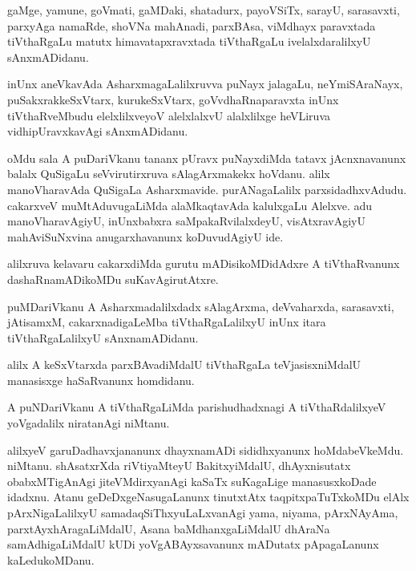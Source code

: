 \documentclass{article}
\begin{document}
\begin{mn}%
gaMge, yamune, goVmati, gaMDaki, shatadurx, payoVSiTx, sarayU, sarasavxti, parxyAga namaRde, shoVNa 
mahAnadi, parxBAsa, viMdhayx paravxtada tiVthaRgaLu matutx himavatapxravxtada tiVthaRgaLu 
ivelalxdaralilxyU sAnxmADidanu.
\end{mn}

\begin{mn}%
inUnx aneVkavAda AsharxmagaLalilxruvva puNayx jalagaLu, neYmiSAraNayx, puSakxrakkeSxVtarx, 
kurukeSxVtarx, goVvdhaRnaparavxta inUnx tiVthaRveMbudu elelxlilxveyoV alelxlalxvU alalxlilxge 
heVLiruva vidhipUravxkavAgi sAnxmADidanu.
\end{mn}

\begin{mn}%
oMdu sala A puDariVkanu tananx pUravx puNayxdiMda tatavx jAcnxnavanunx balalx QuSigaLu 
seVvirutirxruva sAlagArxmakekx hoVdanu. alilx manoVharavAda QuSigaLa Asharxmavide. purANagaLalilx 
parxsidadhxvAdudu. cakarxveV muMtAduvugaLiMda alaMkaqtavAda kalulxgaLu Alelxve. adu 
manoVharavAgiyU, inUnxbabxra saMpakaRvilalxdeyU, visAtxravAgiyU mahAviSuNxvina anugarxhavanunx 
koDuvudAgiyU ide.
\end{mn}

\begin{mn}%
alilxruva kelavaru cakarxdiMda gurutu mADisikoMDidAdxre A tiVthaRvanunx dashaRnamADikoMDu 
suKavAgirutAtxre.
\end{mn}

\begin{mn}%
puMDariVkanu A Asharxmadalilxdadx sAlagArxma, deVvaharxda, sarasavxti, jAtisamxM, cakarxnadigaLeMba 
tiVthaRgaLalilxyU inUnx itara tiVthaRgaLalilxyU sAnxnamADidanu.
\end{mn}

\begin{mn}%
alilx A keSxVtarxda parxBAvadiMdalU tiVthaRgaLa teVjasisxniMdalU manasisxge haSaRvanunx homdidanu.
\end{mn}

\begin{mn}%
A puNDariVkanu A tiVthaRgaLiMda parishudhadxnagi A tiVthaRdalilxyeV yoVgadalilx niratanAgi niMtanu.
\end{mn}

\begin{mn}%
alilxyeV garuDadhavxjananunx dhayxnamADi sididhxyanunx hoMdabeVkeMdu. niMtanu. shAsatxrXda 
riVtiyaMteyU BakitxyiMdalU, dhAyxnisutatx obabxMTigAnAgi jiteVMdirxyanAgi kaSaTx suKagaLige 
manasusxkoDade idadxnu. Atanu geDeDxgeNasugaLanunx tinutxtAtx taqpitxpaTuTxkoMDu elAlx 
pArxNigaLalilxyU samadaqSiThxyuLaLxvanAgi yama, niyama, pArxNAyAma, parxtAyxhAragaLiMdalU, Asana 
baMdhanxgaLiMdalU dhAraNa samAdhigaLiMdalU kUDi yoVgABAyxsavanunx mADutatx pApagaLanunx 
kaLedukoMDanu.
\end{mn}
\end{document}
